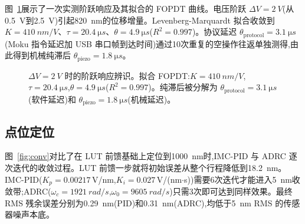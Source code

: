 \documentclass[fleqn,10pt]{wlscirep}
\begin{document}
图~\ref{fig:stepid}展示了一次实测阶跃响应及其拟合的 FOPDT 曲线。电压阶跃 $\Delta V = \SI{2}{V}$(从\SI{0.5}{V}到\SI{2.5}{V})引起\SI{820}{nm}的位移增量。Levenberg-Marquardt 拟合收敛到 $K = \SI{410}{nm/V}$、$\tau = \SI{20.4}{\micro s}$、$\theta = \SI{4.9}{\micro s}$($R^2 = 0.997$)。协议延迟 $\theta_{\text{protocol}} = \SI{3.1}{\micro s}$(Moku 指令延迟加 USB 串口帧到达时间)通过10次重复的空操作往返单独测得,由此得到机械纯滞后 $\theta_{\text{piezo}} = \SI{1.8}{\micro s}$。

\begin{figure}[ht]
    \centering
    \caption{$\Delta V = \SI{2}{V}$ 时的阶跃响应辨识。拟合 FOPDT:$K = \SI{410}{nm/V}$,$\tau = \SI{20.4}{\micro s}$,$\theta = \SI{4.9}{\micro s}$($R^2 = 0.997$)。纯滞后被分解为 $\theta_{\text{protocol}} = \SI{3.1}{\micro s}$(软件延迟)和 $\theta_{\text{piezo}} = \SI{1.8}{\micro s}$(机械延迟)。}
    \label{fig:stepid}
\end{figure}

\subsection*{点位定位}

图~\ref{fig:conv}对比了在 LUT 前馈基础上定位到\SI{1000}{nm}时,IMC-PID 与 ADRC 逐次迭代的收敛过程。LUT 前馈一步就将初始误差从整个行程降低到\SI{18.2}{nm}。IMC-PID($K_p = 0.00217$\,V/nm,$K_i = 0.027$\,V/(nm$\cdot$s))需要6次迭代才能进入\SI{5}{nm}收敛带;ADRC($\omega_c = \SI{1921}{rad/s}$,$\omega_0 = \SI{9605}{rad/s}$)只需3次即可达到同样效果。最终 RMS 残余误差分别为\SI{0.29}{nm}(PID)和\SI{0.31}{nm}(ADRC),均低于\SI{5}{nm} RMS 的传感器噪声本底。
\end{document}
